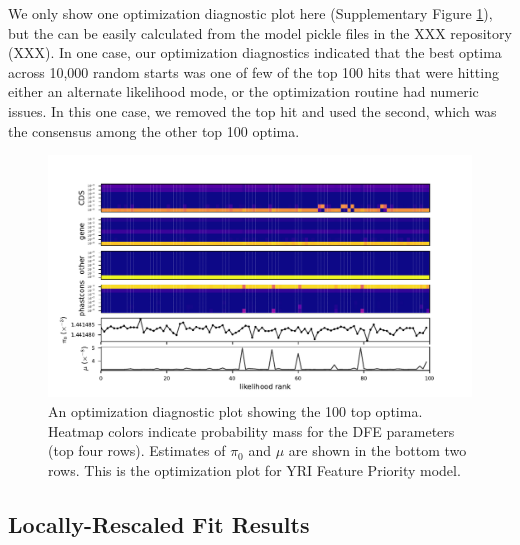 \documentclass[11pt]{article}
\begin{document}
We only show one optimization diagnostic plot here (Supplementary Figure
\ref{suppfig:diag-plot}), but the can be easily calculated from the model
pickle files in the XXX repository (XXX). In one case, our optimization
diagnostics indicated that the best optima across 10,000 random starts was one
of few of the top 100 hits that were hitting either an alternate likelihood
mode, or the optimization routine had numeric issues. In this one case, we
removed the top hit and used the second, which was the consensus among the
other top 100 optima. 

\begin{figure}[htbp]
  \label{suppfig:diag-plot}
  \centering
  \includegraphics[width=\textwidth]{figures/supplementary/figure_feature_priority_yri_full_diag.pdf}

  \caption{ An optimization diagnostic plot showing the 100 top optima. Heatmap
  colors indicate probability mass for the DFE parameters (top four rows).
  Estimates of $\pi_0$ and $\mu$ are shown in the bottom two rows. This is the
optimization plot for YRI Feature Priority model.}
\end{figure}

\subsection{Locally-Rescaled Fit Results}
\end{document}
